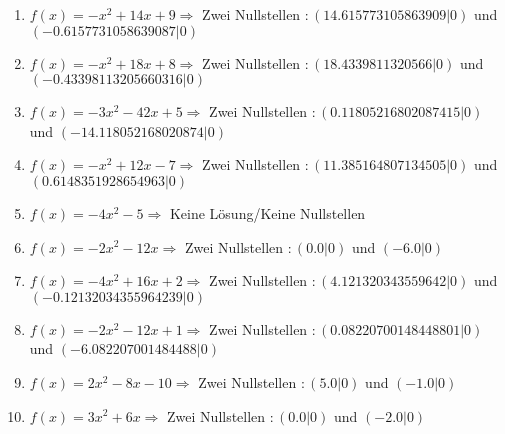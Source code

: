 \documentclass{article}%
\begin{document}
\begin{enumerate}[label=\alph*)]
\item%
\newline\vspace{0.5cm}$f(x)=-x^2 + 14x + 9 \Rightarrow $ Zwei Nullstellen $: (14.615773105863909|0) $ und $ (-0.6157731058639087|0) $%
\item%
\newline\vspace{0.5cm}$f(x)=-x^2 + 18x + 8 \Rightarrow $ Zwei Nullstellen $: (18.4339811320566|0) $ und $ (-0.43398113205660316|0) $%
\item%
\newline\vspace{0.5cm}$f(x)=-3x^2 - 42x + 5 \Rightarrow $ Zwei Nullstellen $: (0.11805216802087415|0) $ und $ (-14.118052168020874|0) $%
\item%
\newline\vspace{0.5cm}$f(x)=-x^2 + 12x - 7 \Rightarrow $ Zwei Nullstellen $: (11.385164807134505|0) $ und $ (0.6148351928654963|0) $%
\item%
\newline\vspace{0.5cm}$f(x)=-4x^2 - 5 \Rightarrow  $ Keine Lösung/Keine Nullstellen $ $%
\item%
\newline\vspace{0.5cm}$f(x)=-2x^2 - 12x \Rightarrow $ Zwei Nullstellen $: (0.0|0) $ und $ (-6.0|0) $%
\item%
\newline\vspace{0.5cm}$f(x)=-4x^2 + 16x + 2 \Rightarrow $ Zwei Nullstellen $: (4.121320343559642|0) $ und $ (-0.12132034355964239|0) $%
\item%
\newline\vspace{0.5cm}$f(x)=-2x^2 - 12x + 1 \Rightarrow $ Zwei Nullstellen $: (0.08220700148448801|0) $ und $ (-6.082207001484488|0) $%
\item%
\newline\vspace{0.5cm}$f(x)=2x^2 - 8x - 10 \Rightarrow $ Zwei Nullstellen $: (5.0|0) $ und $ (-1.0|0) $%
\item%
\newline\vspace{0.5cm}$f(x)=3x^2 + 6x \Rightarrow $ Zwei Nullstellen $: (0.0|0) $ und $ (-2.0|0) $%
\end{enumerate}

%
\end{document}
